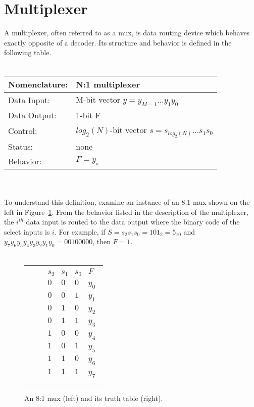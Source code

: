 \section{Multiplexer}
A multiplexer, often referred to as a mux, is data routing device 
which behaves exactly opposite of a decoder.  Its structure and
behavior is defined in the following table.
\\ \\
\begin{tabular}{|l|p{3.5in}|} \hline
Nomenclature:  & N:1 multiplexer                        \\ \hline
Data Input:    & M-bit vector $y=y_{M-1} \ldots y_1 y_0$    \\ \hline
Data Output:   & 1-bit F          \\ \hline
Control:       & $log_2(N)$-bit vector $s = s_{log_2(N)} \ldots s_1 s_0$	\\ \hline
Status:        & none                                   \\ \hline
Behavior:      & $F = y_s$				\\ \hline
\end{tabular}
\label{page:mux}
\\ \\
To understand this definition, examine an
instance of an 8:1 mux shown on the left in Figure~\ref{fig:comboBB8:1}.
From the behavior listed in the description of the multiplexer, 
the $i^{th}$ data input is routed to the data
output where the binary code of the select inputs is $i$.
For example, if $S=s_2 s_1 s_0 = 101_2 = 5_{10}$  and 
$y_7 y_6 y_5 y_4 y_3 y_2 y_1 y_0 = 00100000$, then
$F=1$.
\\ \\
\begin{figure}[ht]
\begin{tabular}{p{1.5in}p{0.5in}l}
\includegraphics[0mm,20mm][12mm,12mm]{8_1} & &
$\begin{array}{c|c|c||c}
s_2 & s_1 & s_0 & F \\ \hline
0 & 0 & 0 & y_0 \\ \hline
0 & 0 & 1 & y_1 \\ \hline
0 & 1 & 0 & y_2 \\ \hline
0 & 1 & 1 & y_3 \\ \hline
1 & 0 & 0 & y_4 \\ \hline
1 & 0 & 1 & y_5 \\ \hline
1 & 1 & 0 & y_6 \\ \hline
1 & 1 & 1 & y_7 \\
\end{array}$
\end{tabular}
\caption{An 8:1 mux (left) and its truth table (right).}
\label{fig:comboBB8:1}
\end{figure}

